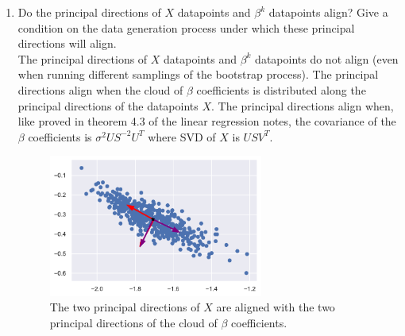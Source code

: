 \documentclass[12pt,twoside]{article}
\begin{document}
\begin{enumerate}
\begin{enumerate}
\item Do the principal directions of $X$ datapoints and $\beta^k$ datapoints align? Give a condition on the data generation process under which these principal directions will align. \\

\medskip
The principal directions of $X$ datapoints and $\beta^k$ datapoints do not align (even when running different samplings of the bootstrap process). 
The principal directions align when the cloud of $\beta$ coefficients is distributed along the principal directions of the datapoints $X$. The principal directions align when,
like proved in theorem 4.3 of the linear regression notes, the covariance of the $\beta$ coefficients is $\sigma^2 U S^{-2} U^T$ where SVD of $X$ is $U S V^T$.

 	\begin{figure}[H]
		\centering
		\includegraphics[width=200pt]{figures/scatter_plot_2.pdf}
		\caption{The two principal directions of $X$ are aligned with the two principal directions of the cloud of $\beta$ coefficients.}
		\label{fig3}
	\end{figure}

\end{enumerate}
\end{enumerate}
\end{document}
